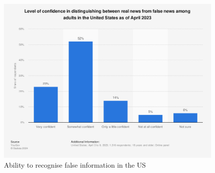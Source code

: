 \begin{figure}[htbp]
    \centering
    \includegraphics[width=0.9\linewidth]{images/statistic_id657090_ability-to-recognize-false-information-and-news-in-the-us-2023.png}
    \caption{Ability to recognise false information in the US \cite{yougov-2023-confidence}}
    \label{fig:ability-to-recognize-false-information-and-news-in-the-us-2023}
\end{figure}

